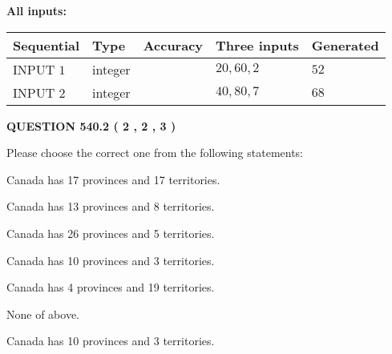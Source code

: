 \documentclass[12pt]{article}
\begin{document}
   
   
   
\noindent{}
   
   
   
   
\noindent\vspace{0.1in}\hspace{-0.08in} {\textbf{\Large{All inputs: }}}
   
   
  
  
\noindent\begin{tabular}{|l|l|l|l|l|}
\hline
 Sequential & Type & Accuracy & Three inputs & Generated \\ 
\hline
 
 
  INPUT $  1 $ & integer &  & $
 20
 , 
 60
 , 
 2
 $ & $ 52 $ 
 \\  \hline  
 
 
  INPUT $  2 $ & integer &  & $
 40
 , 
 80
 , 
 7
 $ & $ 68 $ 
 \\  \hline  
 \end{tabular}
   
   
  
\vspace{0.2in}
  
{\textbf{\Large{QUESTION
540.2 
 ( 2 , 2 , 3 )
}}}
  
  
Please choose the correct one from the following statements:
 
 
Canada has  17 provinces and  17 territories.
 
 
Canada has  13 provinces and  8 territories.
 
 
Canada has  26 provinces and  5 territories.
 
 
Canada has 10  provinces and 3 territories.
 
 
Canada has   4 provinces and  19 territories.
 
 
 None of above.
 
 
\noindent{}
 
 
Canada has 10  provinces and 3 territories.
 
 
\noindent{}
 
 
   
\end{document}
